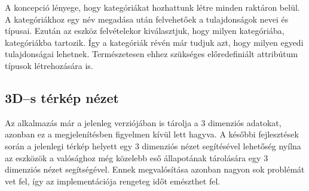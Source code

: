 A koncepció lényege, hogy kategóriákat hozhattunk létre minden raktáron belül.
A kategóriákhoz egy név megadása után felvehetőek a tulajdonságok nevei és típusai.
Ezután az eszköz felvételekor kiválasztjuk, hogy milyen kategóriába, kategóriákba tartozik. 
Így a kategóriák révén már tudjuk azt, hogy milyen egyedi tulajdonságai lehetnek. Természetesen ehhez szükséges előredefiniált attribútum típusok létrehozására is.

\subsection{3D–s térkép nézet}
Az alkalmazás már a jelenleg verziójában is tárolja a 3 dimenziós adatokat, azonban ez a megjelenítésben figyelmen kívül lett hagyva.
A későbbi fejlesztések során a jelenlegi térkép helyett egy 3 dimenziós nézet segítésével lehetőség nyílna az eszközök a valósághoz még közelebb eső állapotának tárolására egy 3 dimenziós nézet segítségével. Ennek megvalósítása azonban nagyon sok problémát vet fel, így az implementációja rengeteg időt emészthet fel.

